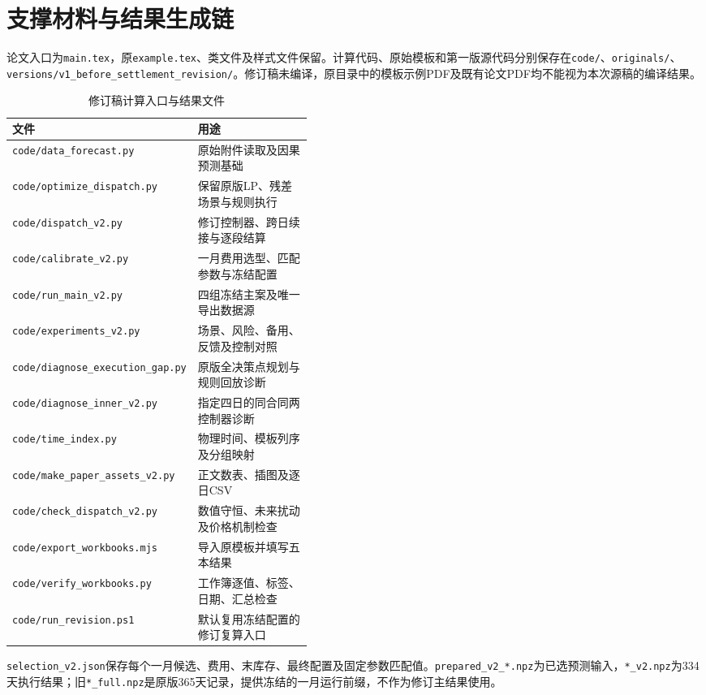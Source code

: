 \section{支撑材料与结果生成链}

论文入口为\texttt{main.tex}，原\texttt{example.tex}、类文件及样式文件保留。计算代码、原始模板和第一版源代码分别保存在\texttt{code/}、\texttt{originals/}、\texttt{versions/v1\_before\_settlement\_revision/}。修订稿未编译，原目录中的模板示例PDF及既有论文PDF均不能视为本次源稿的编译结果。

\begin{table}[htbp]\centering\small
\caption{修订稿计算入口与结果文件}\label{tab:files}
\begin{tabularx}{\linewidth}{p{0.43\linewidth}X}\toprule
文件 & 用途\\\midrule
\texttt{code/data\_forecast.py} & 原始附件读取及因果预测基础\\
\texttt{code/optimize\_dispatch.py} & 保留原版LP、残差场景与规则执行\\
\texttt{code/dispatch\_v2.py} & 修订控制器、跨日续接与逐段结算\\
\texttt{code/calibrate\_v2.py} & 一月费用选型、匹配参数与冻结配置\\
\texttt{code/run\_main\_v2.py} & 四组冻结主案及唯一导出数据源\\
\texttt{code/experiments\_v2.py} & 场景、风险、备用、反馈及控制对照\\
\texttt{code/diagnose\_execution\_gap.py} & 原版全决策点规划与规则回放诊断\\
\texttt{code/diagnose\_inner\_v2.py} & 指定四日的同合同两控制器诊断\\
\texttt{code/time\_index.py} & 物理时间、模板列序及分组映射\\
\texttt{code/make\_paper\_assets\_v2.py} & 正文数表、插图及逐日CSV\\
\texttt{code/check\_dispatch\_v2.py} & 数值守恒、未来扰动及价格机制检查\\
\texttt{code/export\_workbooks.mjs} & 导入原模板并填写五本结果\\
\texttt{code/verify\_workbooks.py} & 工作簿逐值、标签、日期、汇总检查\\
\texttt{code/run\_revision.ps1} & 默认复用冻结配置的修订复算入口\\
\bottomrule\end{tabularx}
\end{table}

\texttt{selection\_v2.json}保存每个一月候选、费用、末库存、最终配置及固定参数匹配值。\texttt{prepared\_v2\_*.npz}为已选预测输入，\texttt{*\_v2.npz}为334天执行结果；旧\texttt{*\_full.npz}是原版365天记录，提供冻结的一月运行前缀，不作为修订主结果使用。

